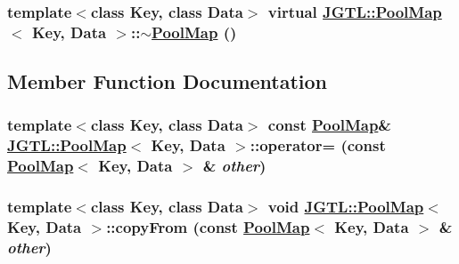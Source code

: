 \hypertarget{class_j_g_t_l_1_1_pool_map_3b37f6bc0c5a42b4354edbd8ce8b907b}{
\subsubsection[$\sim$PoolMap]{\setlength{\rightskip}{0pt plus 5cm}template$<$class Key, class Data$>$ virtual \hyperlink{class_j_g_t_l_1_1_pool_map}{JGTL::Pool\-Map}$<$ Key, Data $>$::$\sim$\hyperlink{class_j_g_t_l_1_1_pool_map}{Pool\-Map} ()}}
\label{class_j_g_t_l_1_1_pool_map_3b37f6bc0c5a42b4354edbd8ce8b907b}




\subsection{Member Function Documentation}
\hypertarget{class_j_g_t_l_1_1_pool_map_205541080219447b7651aadd391816e4}{
\subsubsection[operator=]{\setlength{\rightskip}{0pt plus 5cm}template$<$class Key, class Data$>$ const \hyperlink{class_j_g_t_l_1_1_pool_map}{Pool\-Map}\& \hyperlink{class_j_g_t_l_1_1_pool_map}{JGTL::Pool\-Map}$<$ Key, Data $>$::operator= (const \hyperlink{class_j_g_t_l_1_1_pool_map}{Pool\-Map}$<$ Key, Data $>$ \& {\em other})}}
\label{class_j_g_t_l_1_1_pool_map_205541080219447b7651aadd391816e4}


\hypertarget{class_j_g_t_l_1_1_pool_map_3b3148e41d7f1df718801cd7396fd89f}{
\subsubsection[copyFrom]{\setlength{\rightskip}{0pt plus 5cm}template$<$class Key, class Data$>$ void \hyperlink{class_j_g_t_l_1_1_pool_map}{JGTL::Pool\-Map}$<$ Key, Data $>$::copy\-From (const \hyperlink{class_j_g_t_l_1_1_pool_map}{Pool\-Map}$<$ Key, Data $>$ \& {\em other})}}
\label{class_j_g_t_l_1_1_pool_map_3b3148e41d7f1df718801cd7396fd89f}


